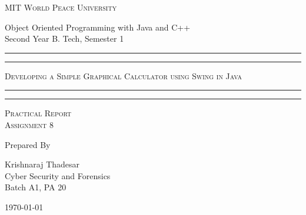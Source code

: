 \documentclass[11pt]{article}
\begin{document}
\begin{titlepage}
	\centering


	\huge\textsc{
		MIT World Peace University
	}\\

	\vspace{0.75\baselineskip} %

	\LARGE{
		Object Oriented Programming with Java and C++\\
		Second Year B. Tech, Semester 1
	}

	\vfill %


	\rule{\textwidth}{1.6pt}\vspace*{-\baselineskip}\vspace*{2pt}
	\rule{\textwidth}{0.6pt}
	\vspace{0.75\baselineskip} %



	\huge{\textsc{
			Developing a Simple Graphical Calculator using Swing in Java
		}} \\



	\vspace{0.5\baselineskip} %
	\rule{\textwidth}{0.6pt}\vspace*{-\baselineskip}\vspace*{2.8pt}
	\rule{\textwidth}{1.6pt}

	\vspace{1\baselineskip} %


	\LARGE\textsc{
		Practical Report\\
		Assignment 8
	} %
	\vfill


	Prepared By
	\vspace{0.5\baselineskip} %

	\Large{
		Krishnaraj Thadesar \\
		Cyber Security and Forensics\\
		Batch A1, PA 20
	}


	\vspace{0.5\baselineskip} %
	\today

\end{titlepage}
\end{document}
